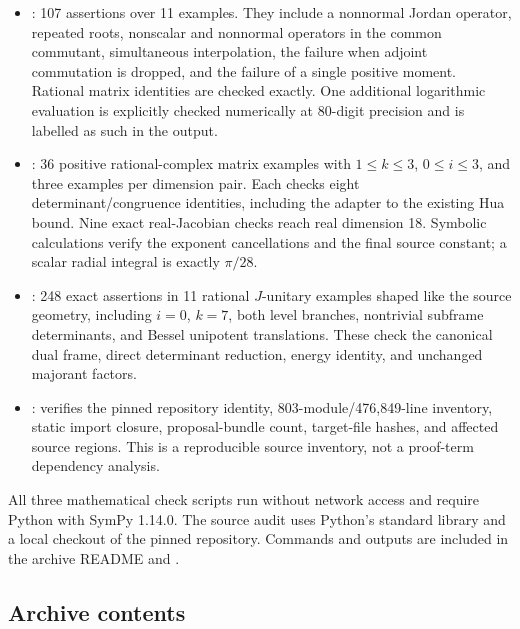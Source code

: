 \begin{itemize}
\item {}: 107 assertions over 11 examples.
They include a nonnormal Jordan operator, repeated roots, nonscalar and
nonnormal operators in the common commutant, simultaneous interpolation,
the failure when adjoint commutation is dropped, and the failure of a
single positive moment. Rational matrix identities are checked exactly.
One additional logarithmic evaluation is explicitly checked numerically at
80-digit precision and is labelled as such in the output.

\item {}: 36 positive rational-complex matrix examples
with \(1\leq k\leq3\), \(0\leq i\leq3\), and three examples per dimension pair.
Each checks eight determinant/congruence identities, including the adapter to
the existing Hua bound. Nine exact real-Jacobian checks reach real dimension 18.
Symbolic calculations verify the exponent cancellations and the final source
constant; a scalar radial integral is exactly \(\pi/28\).

\item {}: 248 exact assertions in 11 rational
\(J\)-unitary examples shaped like the source geometry, including \(i=0\),
\(k=7\), both level branches, nontrivial subframe determinants, and Bessel
unipotent translations. These check the canonical dual frame, direct determinant
reduction, energy identity, and unchanged majorant factors.

\item {}: verifies the pinned repository identity,
803-module/476,849-line inventory, static import closure, proposal-bundle count,
target-file hashes, and affected source regions. This is a reproducible source
inventory, not a proof-term dependency analysis.
\end{itemize}

All three mathematical check scripts run without network access and require
Python with SymPy 1.14.0. The source audit uses Python's standard library and
a local checkout of the pinned repository. Commands and outputs are included
in the archive README and .

\subsection{Archive contents}

